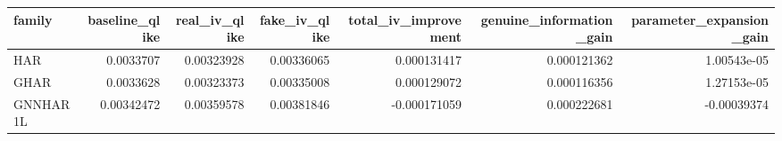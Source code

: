 \begin{tabular}{lrrrrrr}
\toprule
family & baseline_qlike & real_iv_qlike & fake_iv_qlike & total_iv_improvement & genuine_information_gain & parameter_expansion_gain \\
\midrule
HAR & 0.0033707 & 0.00323928 & 0.00336065 & 0.000131417 & 0.000121362 & 1.00543e-05 \\
GHAR & 0.0033628 & 0.00323373 & 0.00335008 & 0.000129072 & 0.000116356 & 1.27153e-05 \\
GNNHAR1L & 0.00342472 & 0.00359578 & 0.00381846 & -0.000171059 & 0.000222681 & -0.00039374 \\
\bottomrule
\end{tabular}
